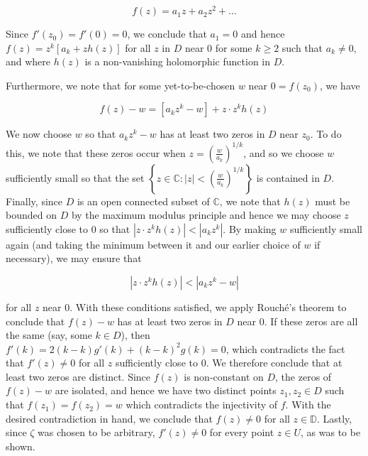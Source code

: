 \begin{solution}
  $$
    f(z) = a_1 z + a_2 z^2 + \hdots
  $$

  Since $f'(z_0) = f'(0) = 0$, we conclude that $a_1 = 0$ and hence $f(z) = z^k[a_k + z h(z)]$ for all $z$ in $D$ near 
  $0$ for some $k \geq 2$ such that $a_k \neq 0$, and where $h(z)$ is a non-vanishing holomorphic function in $D$. 

  Furthermore, we note that for some yet-to-be-chosen $w$ near $0 = f(z_0)$, we have

  $$
  f(z) - w = \left[a_k z^k - w\right] + z \cdot z^k h(z)
  $$

  We now choose $w$ so that $a_k z^k - w$ has at least two zeros in $D$ near $z_0$. To do this, we note that
  these zeros occur when $z = \left(\frac{w}{a_k}\right)^{1/k}$, and so we choose $w$ sufficiently small so
  that the set $\left\{z \in \mathbb{C} : |z| < \left(\frac{w}{a_k}\right)^{1/k}\right\}$ is contained 
  in $D$. Finally, since $D$ is an open connected subset of $\mathbb{C}$, we note that $h(z)$ must be bounded on $D$ by 
  the maximum modulus principle and hence we may choose $z$ sufficiently close to $0$ so that 
  $\left|z \cdot z^k h(z)\right| < \left|a_k z^k\right|$. By making $w$ sufficiently small again
  (and taking the minimum between it and our earlier choice of $w$ if necessary), we may ensure that
 
  $$
    \left|z \cdot z^k h(z)\right| < \left|a_k z^k - w\right|
  $$

  for all $z$ near $0$. With these conditions satisfied, we apply Rouché's theorem to conclude that $f(z) - w$ has at 
  least two zeros in $D$ near $0$. If these zeros are all the same (say, some $k \in D$), then 
  $f'(k) = 2 (k - k) g'(k) + (k - k)^2 g(k) = 0$, which contradicts 
  the fact that $f'(z) \neq 0$ for all $z$ sufficiently close to $0$. We therefore conclude that at least two zeros 
  are distinct.  Since $f(z)$ is non-constant on $D$, the zeros of $f(z) - w$ are isolated, and hence we have two 
  distinct points $z_1, z_2 \in D$ such that $f(z_1) = f(z_2) = w$ which contradicts the injectivity of $f$. With the 
  desired contradiction in hand, we conclude that $f(z) \neq 0$ for all $z \in \mathbb{D}$. Lastly, since $\zeta$ 
  was chosen to be arbitrary, $f'(z) \neq 0$ for every point $z \in U$, as was to be shown.
  \ \\
\end{solution}
